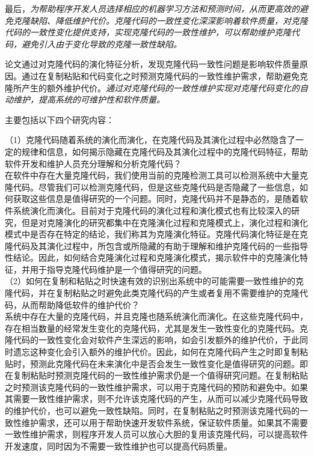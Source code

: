 最后，\emph{为帮助程序开发人员选择相应的机器学习方法和预测时间，从而更高效的避免克隆缺陷、降低维护代价。克隆代码的一致性变化深深影响着软件质量，对克隆代码的一致性变化提供支持，实现克隆代码的一致性维护，可以帮助维护克隆代码，避免引入由于变化导致的克隆一致性缺陷。}

论文通过对克隆代码的演化特征分析，发现克隆代码一致性问题是影响软件质量原因。通过在复制粘贴和代码变化之时预测克隆代码的一致性维护需求，帮助避免克隆所产生的额外维护代价。\emph{通过对克隆代码的一致性维护实现对克隆代码变化的自动维护，提高系统的可维护性和软件质量。}


主要包括以下四个研究内容：

（1）克隆代码随着系统的演化而演化，在克隆代码及其演化过程中必然隐含了一定的规律和信息，如何揭示隐藏在克隆代码及其演化过程中的克隆代码特征，帮助软件开发和维护人员充分理解和分析克隆代码？ \\

在软件中存在大量克隆代码，我们使用当前的克隆检测工具可以检测系统中大量克隆代码。尽管我们可以检测克隆代码，但是这些克隆代码是否隐藏了一些信息，如何获取这些信息是值得研究的一个问题。同时，克隆代码并不是静态的，是随着软件系统演化而演化。目前对于克隆代码的演化过程和演化模式也有比较深入的研究，但是对克隆演化的研究都集中在克隆演化过程和克隆模式上，演化过程和演化模式中是否存在特定的结论，我们称其为克隆演化特征。克隆代码演化特征是在克隆代码及其演化过程中，所包含或所隐藏的有助于理解和维护克隆代码的一些指导性结论。因此，如何结合克隆演化过程和克隆演化模式，揭示软件中的克隆演化特征，并用于指导克隆代码维护是一个值得研究的问题。\\

（2）如何在复制和粘贴之时快速有效的识别出系统中的可能需要一致性维护的克隆代码，并在复制粘贴之时避免此类克隆代码的产生或者复用不需要维护的克隆代码，从而帮助降低软件的维护代价？\\

系统中存在大量的克隆代码，并且克隆也随系统演化而演化。在这些克隆代码中，存在相当数量的经常发生变化的克隆代码，尤其是发生一致性变化的克隆代码。克隆代码的一致性变化会对软件产生深远的影响，如会引发额外的维护代价，于此同时遗忘这种变化会引入额外的维护代价。因此，如何在克隆代码产生之时即复制粘贴时，预测此克隆代码在未来演化中是否会发生一致性变化是值得研究的问题。即在复制粘贴时预测克隆代码的一致性维护需求仍是一个值得研究问题。在复制粘贴之时预测该克隆代码的一致性维护需求，可以用于克隆代码的预防和避免中。如果其需要一致性维护需求，则不允许该克隆代码的产生，从而可以减少克隆代码导致的维护代价，也可以避免一致性缺陷。同时，在复制粘贴之时预测该克隆代码的一致性维护需求，还可以用于帮助快速开发软件系统，保证软件质量。如果其不需要一致性维护需求，则程序开发人员可以放心大胆的复用该克隆代码，可以提高软件开发速度，同时因为不需要一致性维护也可以提高代码质量。\\

